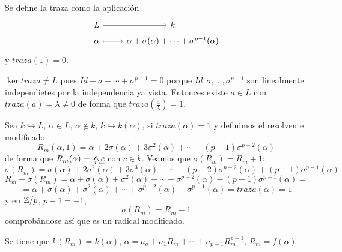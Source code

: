\begin{defi}
    Se define la traza como la aplicaci\'on
    $$\bt L \rar & k \\[-5mm] \alpha \rarmaps & \alpha+ \sigma(\alpha) + \cdots + \sigma^{p-1}(\alpha) \et$$
    y $traza (1)=0$.

    $\ker traza \neq L$ pues $Id + \sigma + \cdots + \sigma^{p-1} = 0$ porque $Id, \sigma, \ldots, \sigma^{p-1}$ son linealmente independietes por la independencia ya vista. Entonces existe $a\in L$ con $traza(a) =\lambda \neq 0$ de forma que $traza(\frac{a}{\lambda}) = 1$. 
\end{defi}

Sea $k \hookrightarrow L$, $\alpha\in L$, $\alpha \nin k$, $k \hookrightarrow k(\alpha)$, si $traza(\alpha) = 1$ y definimos el resolvente modificado
$$R_m(\alpha,1) = \alpha+ 2\sigma(\alpha) + 3 \sigma^2(\alpha) + \cdots + (p-1) \sigma^{p-2}(\alpha)$$
de forma que $R_m(\alpha) = \usqrt[p]{c}$ con $c\in k$. Veamos que $\sigma(R_m) = R_m+1$:
$$\sigma(R_m) = \sigma(\alpha)+2\sigma^2(\alpha) + 3 \sigma^3(\alpha) + \cdots  + (p-2) \sigma^{p-2}(\alpha) + (p-1)\sigma^{p-1}(\alpha)$$
$$R_m - \sigma(R_m)= \alpha  +  \sigma(\alpha) +  \sigma^2(\alpha) + \cdots +  \sigma^{p-2}(\alpha) - (p-1)\sigma^{p-1}(\alpha) = $$
$$= \alpha  +  \sigma(\alpha) +  \sigma^2(\alpha) + \cdots +  \sigma^{p-2}(\alpha)+ \sigma^{p-1}(\alpha) = traza(\alpha) = 1  $$
y en $\mathbb{Z}/p$, $p-1=-1$, 
$$\sigma(R_m) = R_m-1$$
comprob\'andose as\'i que es un radical modificado. 

Se tiene que $k(R_m) = k(\alpha)$, $\alpha= a_o + a_1 R_m+ \cdots  + a_{p-1} R_m^{p-1}$, $R_m = f(\alpha)$

